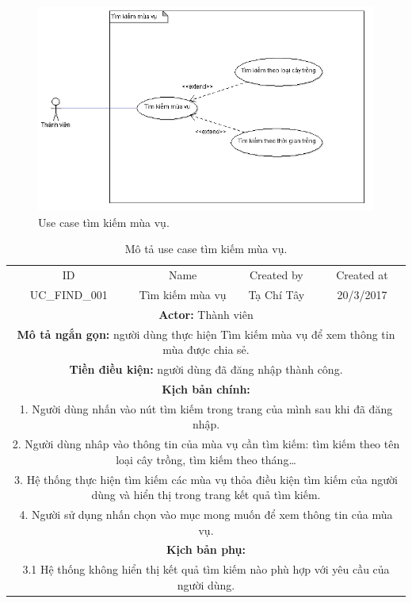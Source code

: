 \documentclass[a4paper,12pt,oneside]{article}
\begin{document}
\begin{figure}[H]
	\centering
	\includegraphics[scale=.9]{hinh/TimKiemMuaVu.png}
	\caption{Use case tìm kiếm mùa vụ.}
\end{figure}

\begin{table}[!htp]
\centering
\begin{tabularx}{\linewidth}{ |c||c|c|c| }
\hline
ID & Name & Created by & Created at\\
UC\_FIND\_001 & Tìm kiếm mùa vụ & Tạ Chí Tây & 20/3/2017\\
\hline
\multicolumn{4}{|X|}{\textbf{Actor:} Thành viên }\\
\hline
\multicolumn{4}{|X|}{\textbf{Mô tả ngắn gọn:} người dùng thực hiện Tìm kiếm mùa vụ để xem thông tin mùa được chia sẻ. }\\
\hline
\multicolumn{4}{|X|}{\textbf{Tiền điều kiện:} người dùng đã đăng nhập thành công.}\\
\hline
\multicolumn{4}{|X|}{\textbf{Kịch bản chính:}}\\
\multicolumn{4}{|X|}{ 
1. Người dùng nhấn vào nút tìm kiếm trong trang của mình sau khi đã đăng nhập.}\\
\multicolumn{4}{|X|}{ 
2.	Người dùng nhâp vào thông tin của mùa vụ cần tìm kiếm: tìm kiếm theo tên loại cây trồng, tìm kiếm theo tháng…}\\
\multicolumn{4}{|X|}{
3. Hệ thống thực hiện tìm kiếm các mùa vụ thỏa điều kiện tìm kiếm của người dùng và hiển thị trong trang kết quả tìm kiếm.}\\
\multicolumn{4}{|X|}{
4.	Người sử dụng nhấn chọn vào mục mong muốn để xem thông tin của mùa vụ.}\\
\hline
\multicolumn{4}{|X|}{\textbf{Kịch bản phụ:}}\\
\multicolumn{4}{|X|}{3.1	Hệ thống không hiển thị kết quả tìm kiếm nào phù hợp với yêu cầu của người dùng.}\\
\hline
\end{tabularx}
\caption{Mô tả use case tìm kiếm mùa vụ.}
\end{table}
\end{document}
